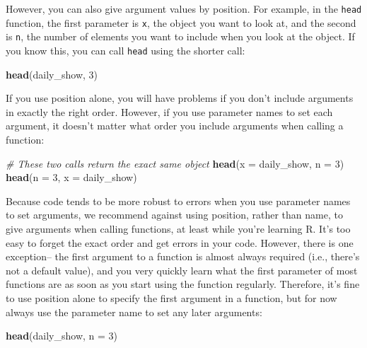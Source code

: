 \documentclass[]{book}
\makeatletter
\newenvironment{Shaded}{\begin{snugshade}}{\end{snugshade}}
\newcommand{\KeywordTok}[1]{\textcolor[rgb]{0.13,0.29,0.53}{\textbf{#1}}}
\newcommand{\DataTypeTok}[1]{\textcolor[rgb]{0.13,0.29,0.53}{#1}}
\newcommand{\DecValTok}[1]{\textcolor[rgb]{0.00,0.00,0.81}{#1}}
\newcommand{\CommentTok}[1]{\textcolor[rgb]{0.56,0.35,0.01}{\textit{#1}}}
\newcommand{\NormalTok}[1]{#1}
\newenvironment{kframe}{%
\medskip{}
\setlength{\fboxsep}{.8em}
 \def\at@end@of@kframe{}%
 \ifinner\ifhmode%
  \def\at@end@of@kframe{\end{minipage}}%
  \begin{minipage}{\columnwidth}%
 \fi\fi%
 \def\FrameCommand##1{\hskip\@totalleftmargin \hskip-\fboxsep
 \colorbox{shadecolor}{##1}\hskip-\fboxsep
     \hskip-\linewidth \hskip-\@totalleftmargin \hskip\columnwidth}%
 \MakeFramed {\advance\hsize-\width
   \@totalleftmargin\z@ \linewidth\hsize
   \@setminipage}}%
 {\par\unskip\endMakeFramed%
 \at@end@of@kframe}
\renewenvironment{Shaded}{\begin{kframe}}{\end{kframe}}
\theoremstyle{definition}
\theoremstyle{definition}
\theoremstyle{definition}
\theoremstyle{remark}
\makeatother
\begin{document}
However, you can also give argument values by position. For example, in
the \texttt{head} function, the first parameter is \texttt{x}, the
object you want to look at, and the second is \texttt{n}, the number of
elements you want to include when you look at the object. If you know
this, you can call \texttt{head} using the shorter call:

\begin{Shaded}
\begin{Highlighting}[]
\KeywordTok{head}\NormalTok{(daily_show, }\DecValTok{3}\NormalTok{)}
\end{Highlighting}
\end{Shaded}

If you use position alone, you will have problems if you don't include
arguments in exactly the right order. However, if you use parameter
names to set each argument, it doesn't matter what order you include
arguments when calling a function:

\begin{Shaded}
\begin{Highlighting}[]
\CommentTok{# These two calls return the exact same object}
\KeywordTok{head}\NormalTok{(}\DataTypeTok{x =}\NormalTok{ daily_show, }\DataTypeTok{n =} \DecValTok{3}\NormalTok{)}
\KeywordTok{head}\NormalTok{(}\DataTypeTok{n =} \DecValTok{3}\NormalTok{, }\DataTypeTok{x =}\NormalTok{ daily_show)}
\end{Highlighting}
\end{Shaded}

Because code tends to be more robust to errors when you use parameter
names to set arguments, we recommend against using position, rather than
name, to give arguments when calling functions, at least while you're
learning R. It's too easy to forget the exact order and get errors in
your code. However, there is one exception-- the first argument to a
function is almost always required (i.e., there's not a default value),
and you very quickly learn what the first parameter of most functions
are as soon as you start using the function regularly. Therefore, it's
fine to use position alone to specify the first argument in a function,
but for now always use the parameter name to set any later arguments:

\begin{Shaded}
\begin{Highlighting}[]
\KeywordTok{head}\NormalTok{(daily_show, }\DataTypeTok{n =} \DecValTok{3}\NormalTok{)}
\end{Highlighting}
\end{Shaded}
\end{document}
